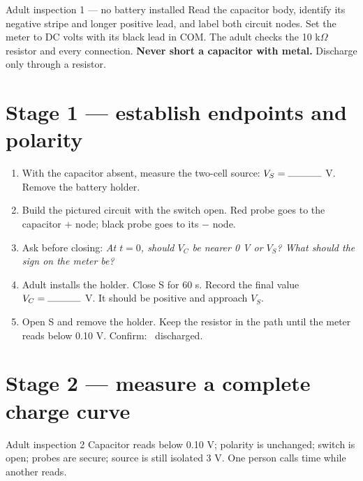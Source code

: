 \begin{gate}{Adult inspection 1 — no battery installed}
Read the capacitor body, identify its negative stripe and longer positive lead,
and label both circuit nodes. Set the meter to DC volts with its black lead in
COM. The adult checks the 10 k\(\Omega\) resistor and every connection.
\textbf{Never short a capacitor with metal.} Discharge only through a resistor.
\end{gate}

\section{Stage 1 — establish endpoints and polarity}

\begin{enumerate}
\item With the capacitor absent, measure the two-cell source:
  \(V_S=\rule{1.2cm}{.3pt}\) V. Remove the battery holder.
\item Build the pictured circuit with the switch open. Red probe goes to the
  capacitor \(+\) node; black probe goes to its \( - \) node.
\item Ask before closing: \textit{At \(t=0\), should \(V_C\) be nearer 0 V or
  \(V_S\)? What should the sign on the meter be?}
\item Adult installs the holder. Close S for 60 s. Record the final value
  \(V_C=\rule{1.2cm}{.3pt}\) V. It should be positive and approach \(V_S\).
\item Open S and remove the holder. Keep the resistor in the path until the
  meter reads below 0.10 V. Confirm: \checkoff\ discharged.
\end{enumerate}

\begin{center}
\end{center}

\newpage
{}

\section{Stage 2 — measure a complete charge curve}

\begin{gate}{Adult inspection 2}
Capacitor reads below 0.10 V; polarity is unchanged; switch is open; probes are
secure; source is still isolated 3 V. One person calls time while another reads.
\end{gate}

